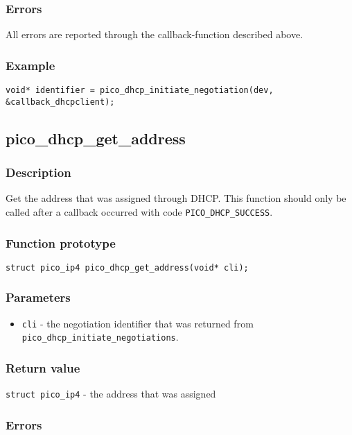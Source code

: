 \subsubsection*{Errors}
All errors are reported through the callback-function described above.

\subsubsection*{Example}
\begin{verbatim}
void* identifier = pico_dhcp_initiate_negotiation(dev, &callback_dhcpclient);
\end{verbatim}


\subsection{pico\_dhcp\_get\_address}

\subsubsection*{Description}
Get the address that was assigned through DHCP. This function should only be called after a callback occurred with code \texttt{PICO\_DHCP\_SUCCESS}. 

\subsubsection*{Function prototype}
\texttt{struct pico\_ip4 pico\_dhcp\_get\_address(void* cli);}

\subsubsection*{Parameters}
\begin{itemize}
\item \texttt{cli} - the negotiation identifier that was returned from \texttt{pico\_dhcp\_initiate\_negotiations}.
\end{itemize}

\subsubsection*{Return value}
\texttt{struct pico\_ip4} - the address that was assigned

\subsubsection*{Errors}

